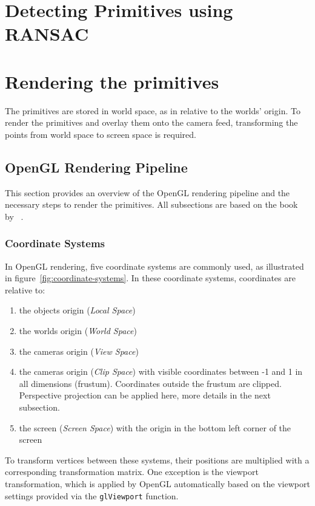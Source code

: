\section{Detecting Primitives using RANSAC}

\parencite{schnabel_efficient_2007}


\section{Rendering the primitives}\label{sec:rendering-the-primitives}
The primitives are stored in world space, as in relative to the worlds' origin.
To render the primitives and overlay them onto the camera feed,
transforming the points from world space to screen space is required.

\subsection{OpenGL Rendering Pipeline}
This section provides an overview of the OpenGL rendering pipeline and the necessary steps to render the primitives.
All subsections are based on the book~ by \citeauthor{de_vries_learn_2020}~\parencite{de_vries_learn_2020}.

\subsubsection{Coordinate Systems}\label{subsec:coordinate-systems}
In OpenGL rendering, five coordinate systems are commonly used, as illustrated in figure~\ref{fig:coordinate-systems}.
In these coordinate systems, coordinates are relative to:
\begin{enumerate}
    \item the objects origin (\textit{Local Space})
    \item the worlds origin (\textit{World Space})
    \item the cameras origin (\textit{View Space})
    \item the cameras origin (\textit{Clip Space}) with visible coordinates between -1 and 1 in all dimensions (frustum).
    Coordinates outside the frustum are clipped.
    Perspective projection can be applied here, more details in the next subsection.
    \item the screen (\textit{Screen Space})  with the origin in the bottom left corner of the screen
\end{enumerate}
To transform vertices between these systems, their positions are multiplied with a corresponding transformation matrix.
One exception is the viewport transformation,
which is applied by OpenGL automatically based on the viewport settings provided via the \texttt{glViewport} function.

